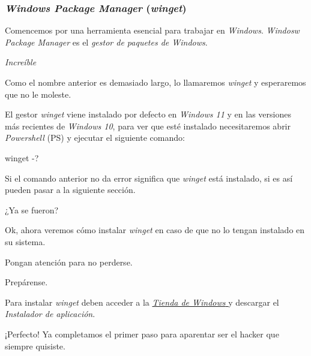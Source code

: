 \subsubsection{\textit{Windows Package Manager} (\textit{winget})}
  Comencemos por una herramienta esencial para trabajar en \textit{Windows}.
  \textit{Windosw Package Manager}\autocite{kevinlamsUseWingetTool} es el \textit{gestor de 
  paquetes de Windows}.
  \begin{center}
    \textit{Increíble}
  \end{center}
  Como el nombre anterior es demasiado largo, lo llamaremos \textit{winget} y esperaremos que no 
  le moleste.

  El gestor \textit{winget} viene instalado por defecto en \textit{Windows 11} y en las versiones
  más recientes de \textit{Windows 10}, para ver que esté instalado necesitaremos abrir 
  \textit{Powershell} (PS) y ejecutar el siguiente comando:
  \begin{powershell}
    winget -?
  \end{powershell}
  Si el comando anterior no da error significa que \textit{winget} está instalado, si es así
  pueden pasar a la siguiente sección.

  ¿Ya se fueron?
  
  Ok, ahora veremos cómo instalar \textit{winget} en caso de que no lo tengan instalado en su
  sistema.

  Pongan atención para no perderse.

  Prepárense.

  Para instalar \textit{winget} deben acceder a la 
  \href{https://apps.microsoft.com/store/detail/app-installer/9NBLGGH4NNS1}{
    \textit{Tienda de Windows}
  } y descargar el \textit{Instalador de aplicación}.

  ¡Perfecto! Ya completamos el primer paso para aparentar ser el hacker que siempre quisiste.